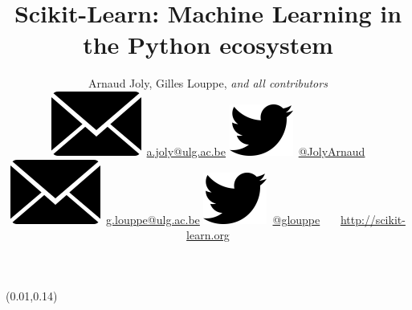 \documentclass[final]{beamer}
\title{Scikit-Learn: Machine Learning in the Python ecosystem}
\author{Arnaud Joly, Gilles Louppe, \textit{and all \sklearn contributors}\\[1.5ex]
{\tiny
\includegraphics[scale=0.16]{mail}~\url{a.joly@ulg.ac.be}
\includegraphics[scale=0.6]{twitter}~\href{https://twitter.com/JolyArnaud}{@JolyArnaud}
\includegraphics[scale=0.16]{mail}~\url{g.louppe@ulg.ac.be}
\includegraphics[scale=0.6]{twitter}~\href{https://twitter.com/glouppe}{@glouppe}
~~~\url{http://scikit-learn.org}
}
}
\date{}
\begin{document}
\begin{frame}[fragile]



\begin{textblock}{0.32}(0.01,0.14)









\end{textblock}
\end{frame}
\end{document}
